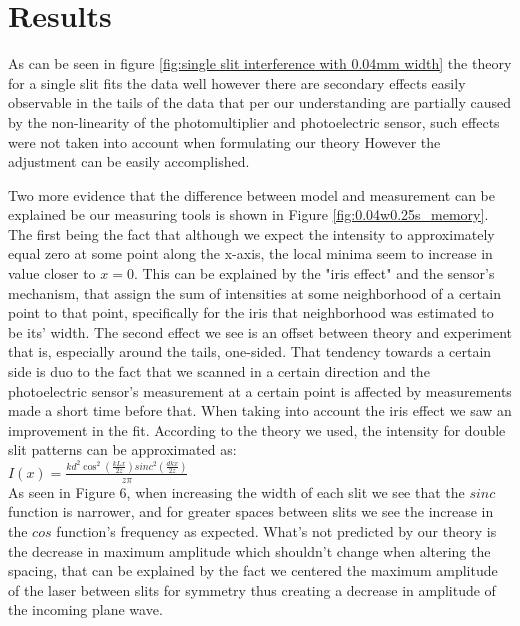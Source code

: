 \section{Results}\label{sec:results}
As can be seen in figure \ref{fig:single slit interference with 0.04mm width} the theory for a single slit fits the data well however there are
secondary effects easily observable in the tails of the data that per our understanding are partially caused by the non-linearity of the
photomultiplier and photoelectric sensor, such effects were not taken into account when formulating our theory
However the adjustment can be easily accomplished.



Two more evidence that the difference between model and measurement can be explained be our measuring tools is shown in Figure {\ref{fig:0.04w0.25s_memory}}.
The first being the fact that although we expect the intensity to approximately equal zero at some point along the x-axis, the local minima seem to increase in value closer to $x=0$.
This can be explained by the "iris effect" and the sensor's mechanism, that assign the sum of intensities at some neighborhood of a certain point to that point, specifically for the iris that neighborhood was estimated to be its' width.
The second effect we see is an offset between theory and experiment that is, especially around the tails, one-sided.
That tendency towards a certain side is duo to the fact that we scanned in a certain direction and the photoelectric sensor's measurement at a certain point is affected by measurements made a short time before that.
When taking into account the iris effect we saw an improvement in the fit.
According to the theory we used, the intensity for double slit patterns can be approximated as:\\
$I(x)=\frac{kd^2\cos^2\left(\frac{kLx}{2z}\right)sinc^2\left(\frac{dkx}{2z}\right)}{z\pi}$\\
As seen in Figure 6, when increasing the width of each slit we see that the $sinc$ function is narrower, and for greater spaces between slits we see the increase in the $cos$ function's frequency as expected.
What's not predicted by our theory is the decrease in maximum amplitude which shouldn't change when altering the spacing,
that can be explained by the fact we centered the maximum amplitude of the laser between slits for symmetry thus creating a decrease in amplitude of the incoming plane wave.


